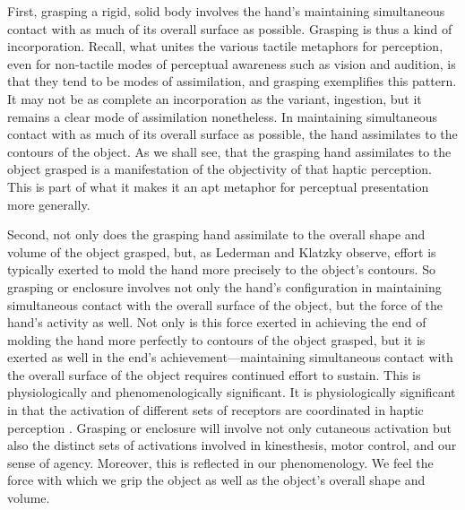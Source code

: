 \documentclass[12pt]{article}
\begin{document}
First, grasping a rigid, solid body involves the hand's maintaining simultaneous contact with as much of its overall surface as possible. Grasping is thus a kind of incorporation. Recall, what unites the various tactile metaphors for perception, even for non-tactile modes of perceptual awareness such as vision and audition, is that they tend to be modes of assimilation, and grasping exemplifies this pattern. It may not be as complete an incorporation as the variant, ingestion, but it remains a clear mode of assimilation nonetheless. In maintaining simultaneous contact with as much of its overall surface as possible, the hand assimilates to the contours of the object. As we shall see, that the grasping hand assimilates to the object grasped is a manifestation of the objectivity of that haptic perception. This is part of what it makes it an apt metaphor for perceptual presentation more generally.

Second, not only does the grasping hand assimilate to the overall shape and volume of the object grasped, but, as Lederman and Klatzky observe, effort is typically exerted to mold the hand more precisely to the object's contours. So grasping or enclosure involves not only the hand's configuration in maintaining simultaneous contact with the overall surface of the object, but the force of the hand's activity as well. Not only is this force exerted in achieving the end of molding the hand more perfectly to contours of the object grasped, but it is exerted as well in the end's achievement---maintaining simultaneous contact with the overall surface of the object requires continued effort to sustain. This is physiologically and phenomenologically significant. It is physiologically significant in that the activation of different sets of receptors are coordinated in haptic perception \citep[see][chapter 3, for discussion]{Fulkerson:2014ek}. Grasping or enclosure will involve not only cutaneous activation but also the distinct sets of activations involved in kinesthesis, motor control, and our sense of agency. Moreover, this is reflected in our phenomenology. We feel the force with which we grip the object as well as the object's overall shape and volume.
\end{document}
